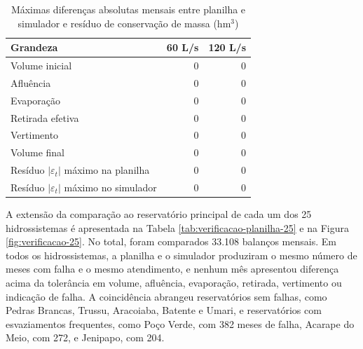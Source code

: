 \begin{table}[H]
    \captionsetup{width=15cm}
    \caption{Máximas diferenças absolutas mensais entre planilha e simulador e resíduo de conservação de massa (hm$^3$)}
    \label{tab:verificacao-residuos}
    \centering
    \footnotesize
    \begin{tabular}{lrr}
        \toprule
        Grandeza & 60 L/s & 120 L/s \\
        \midrule
        Volume inicial & 0 & 0 \\
        Afluência & 0 & 0 \\
        Evaporação & 0 & 0 \\
        Retirada efetiva & 0 & 0 \\
        Vertimento & 0 & 0 \\
        Volume final & 0 & 0 \\
        Resíduo $|\varepsilon_t|$ máximo na planilha & 0 & 0 \\
        Resíduo $|\varepsilon_t|$ máximo no simulador & 0 & 0 \\
        \bottomrule
    \end{tabular}
\end{table}

A extensão da comparação ao reservatório principal de cada um dos 25 hidrossistemas é apresentada na Tabela \ref{tab:verificacao-planilha-25} e na Figura \ref{fig:verificacao-25}. No total, foram comparados 33.108 balanços mensais. Em todos os hidrossistemas, a planilha e o simulador produziram o mesmo número de meses com falha e o mesmo atendimento, e nenhum mês apresentou diferença acima da tolerância em volume, afluência, evaporação, retirada, vertimento ou indicação de falha. A coincidência abrangeu reservatórios sem falhas, como Pedras Brancas, Trussu, Aracoiaba, Batente e Umari, e reservatórios com esvaziamentos frequentes, como Poço Verde, com 382 meses de falha, Acarape do Meio, com 272, e Jenipapo, com 204.

